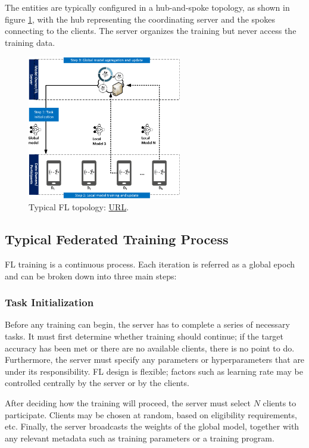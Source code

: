 The entities are typically configured in a hub-and-spoke topology, as shown in figure \ref{fig:FL topology}, with the hub representing the coordinating server and the spokes connecting to the clients. The server organizes the training but never access the training data.
\begin{figure}[H]
    \centering
        \includegraphics[width=0.6\textwidth]{Images/topologies/fl_topology.png}
        \decoRule
        \caption[FL topology]{Typical FL topology: \href{https://ieeexplore.ieee.org/document/9060868}{URL}.}
        \label{fig:FL topology}
\end{figure}

\subsection{Typical Federated Training Process}
FL training is a continuous process. Each iteration is referred as a global epoch and can be broken down into three main steps:

\subsubsection{Task Initialization}
Before any training can begin, the server has to complete a series of necessary tasks. It must first determine whether training should continue; if the target accuracy has been met or there are no available clients, there is no point to do. Furthermore, the server must specify any parameters or hyperparameters that are under its responsibility. FL design is flexible; factors such as learning rate may be controlled centrally by the server or by the clients.

After deciding how the training will proceed, the server must select \(N\) clients to participate. Clients may be chosen at random, based on eligibility requirements, etc. Finally, the server broadcasts the weights of the global model, together with any relevant metadata such as training parameters or a training program.


